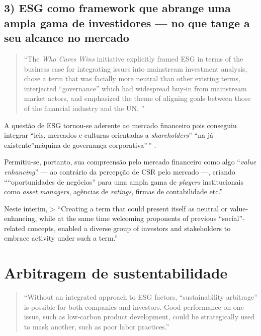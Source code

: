 \documentclass[12pt]{article}
\numberwithin{equation}{section}
\theoremstyle{plain}
\theoremstyle{definition}
\theoremstyle{remark}
\begin{document}
\hypertarget{esg-como-framework-que-abrange-uma-ampla-gama-de-investidores-no-que-tange-a-seu-alcance-no-mercado}{%
\subsection{3) ESG como framework que abrange uma ampla gama de investidores --- no que tange a seu alcance no mercado}\label{esg-como-framework-que-abrange-uma-ampla-gama-de-investidores-no-que-tange-a-seu-alcance-no-mercado}}

\begin{quote}
``The \textit{Who Cares Wins} initiative explicitly framed ESG in terms of the business case for integrating issues into mainstream investment analysis, chose a term that was facially more neutral than other existing terms, interjected ``governance'' which had widespread buy-in from mainstream market actors, and emphasized the theme of aligning goals between those of the financial industry and the UN. \parencite[, p. 30]{Pollman2022}''
\end{quote}

A questão de ESG tornou-se aderente ao mercado financeiro pois conseguiu integrar ``leis, mercados e culturas orientadas a \textit{shareholders}'' ``na já existente''máquina de governança corporativa''\,'' \parencite[, p. 30]{Pollman2022}.

Permitiu-se, portanto, sua compreensão pelo mercado financeiro como algo ``\textit{value enhancing}'' --- ao contrário da percepção de CSR pelo mercado ---, criando ````oportunidades de negócios'' para uma ampla gama de \textit{players} institucionais como \textit{asset managers}, agências de \textit{ratings}, firmas de contabilidade etc.'' \parencite[, p. 30-1]{Pollman2022}

Neste ínterim, \textgreater{} ``Creating a term that could present itself as neutral or value-enhancing, while at the same time welcoming proponents of previous ``social''-related concepts, enabled a diverse group of investors and stakeholders to embrace activity under such a term.'' \parencite[, p. 31]{Pollman2022}

\hypertarget{arbitragem-de-sustentabilidade}{%
\section{Arbitragem de sustentabilidade}\label{arbitragem-de-sustentabilidade}}

\begin{quote}
``Without an integrated approach to ESG factors, ``sustainability arbitrage'' is possible for both companies and investors. Good performance on one issue, such as low-carbon product development, could be strategically used to mask another, such as poor labor practices.'' \parencite[, p. 34]{Pollman2022}
\end{quote}
\end{document}
